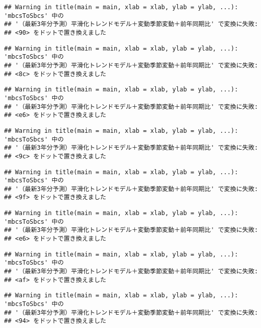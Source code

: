 \documentclass[]{article}
\begin{document}
\begin{verbatim}
## Warning in title(main = main, xlab = xlab, ylab = ylab, ...): 'mbcsToSbcs' 中の
## '（最新3年分予測）平滑化トレンドモデル＋変動季節変動＋前年同期比' で変換に失敗:
## <90> をドットで置き換えました
\end{verbatim}

\begin{verbatim}
## Warning in title(main = main, xlab = xlab, ylab = ylab, ...): 'mbcsToSbcs' 中の
## '（最新3年分予測）平滑化トレンドモデル＋変動季節変動＋前年同期比' で変換に失敗:
## <8c> をドットで置き換えました
\end{verbatim}

\begin{verbatim}
## Warning in title(main = main, xlab = xlab, ylab = ylab, ...): 'mbcsToSbcs' 中の
## '（最新3年分予測）平滑化トレンドモデル＋変動季節変動＋前年同期比' で変換に失敗:
## <e6> をドットで置き換えました
\end{verbatim}

\begin{verbatim}
## Warning in title(main = main, xlab = xlab, ylab = ylab, ...): 'mbcsToSbcs' 中の
## '（最新3年分予測）平滑化トレンドモデル＋変動季節変動＋前年同期比' で変換に失敗:
## <9c> をドットで置き換えました
\end{verbatim}

\begin{verbatim}
## Warning in title(main = main, xlab = xlab, ylab = ylab, ...): 'mbcsToSbcs' 中の
## '（最新3年分予測）平滑化トレンドモデル＋変動季節変動＋前年同期比' で変換に失敗:
## <9f> をドットで置き換えました
\end{verbatim}

\begin{verbatim}
## Warning in title(main = main, xlab = xlab, ylab = ylab, ...): 'mbcsToSbcs' 中の
## '（最新3年分予測）平滑化トレンドモデル＋変動季節変動＋前年同期比' で変換に失敗:
## <e6> をドットで置き換えました
\end{verbatim}

\begin{verbatim}
## Warning in title(main = main, xlab = xlab, ylab = ylab, ...): 'mbcsToSbcs' 中の
## '（最新3年分予測）平滑化トレンドモデル＋変動季節変動＋前年同期比' で変換に失敗:
## <af> をドットで置き換えました
\end{verbatim}

\begin{verbatim}
## Warning in title(main = main, xlab = xlab, ylab = ylab, ...): 'mbcsToSbcs' 中の
## '（最新3年分予測）平滑化トレンドモデル＋変動季節変動＋前年同期比' で変換に失敗:
## <94> をドットで置き換えました
\end{verbatim}
\end{document}
